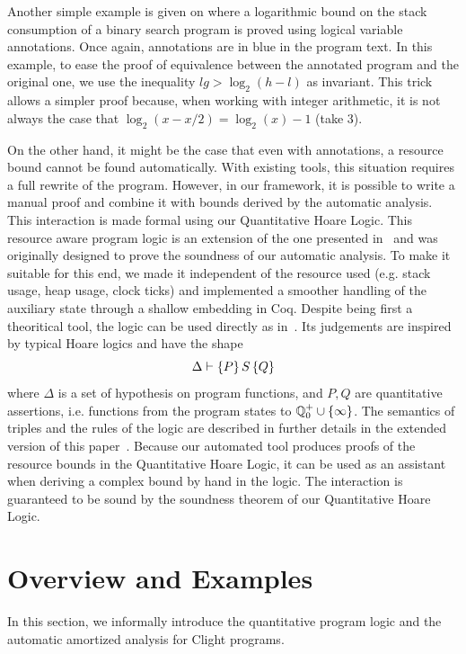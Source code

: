 \documentclass[nocopyrightspace,preprint,pldi]{sigplanconf-pldi15}
\newcommand{\ifshort}[2]{\ifx\fullversion\undefined{#1}\else{#2}\fi}
\newcommand{\sectskip}[0]{\ifshort{\vspace{-3pt}}{}}
\newcommand{\aftersectskip}[0]{\ifshort{\vspace{-1pt}}{}}
\newcommand{\pref}[1]{\prettyref{#1}}
\begin{document}
Another simple example is given on \pref{fig:xmplbsaux} where
a logarithmic bound on the stack consumption of a binary search
program is proved using logical variable annotations.  Once again,
annotations are in blue in the program text.  In this example,
to ease the proof of equivalence between the annotated program
and the original one, we use the inequality $lg >
\log_2(h-l)$ as invariant.  This trick allows a simpler
proof because, when working with integer arithmetic, it is not always
the case that $\log_2(x-x/2) = \log_2(x)-1$ (take 3).

On the other hand, it might be the case that even with annotations, a
resource bound cannot be found automatically.  With existing tools, this
situation requires a full rewrite of the program.  However, in our
framework, it is possible to write a manual proof and combine it with
bounds derived by the automatic analysis.  This interaction is made
formal using our Quantitative Hoare Logic.  This resource aware program
logic is an extension of the one presented in~\cite{veristack14} and
was originally designed to prove the soundness of our automatic
analysis.  To make it suitable for this end, we made it independent
of the resource used (e.g. stack usage, heap usage, clock ticks) and
implemented a smoother handling of the auxiliary state through a shallow
embedding in Coq.  Despite being first a theoritical tool, the logic can
be used directly as in~\cite{veristack14}.  Its judgements are inspired
by typical Hoare logics and have the shape
$$
\Delta \vdash \{P\}\, S\, \{Q\}
$$
where $\Delta$ is a set of hypothesis on program functions, and $P, Q$
are quantitative assertions, i.e. functions from the program states
to $\mathbb Q^+_0 \cup \{\infty\}$.  The semantics of triples and the rules
of the logic are described in further details in the extended version of
this paper~\cite{anon_extended}.  Because our automated tool produces
proofs of the resource bounds in the Quantitative Hoare Logic, it can
be used as an assistant when deriving a complex bound by hand in the
logic.  The interaction is guaranteed to be sound by the soundness
theorem of our Quantitative Hoare Logic.

\sectskip
\section{Overview and Examples}
\label{sec:inform}
\aftersectskip

In this section, we informally introduce the quantitative program
logic and the automatic amortized analysis for Clight programs.
\end{document}
